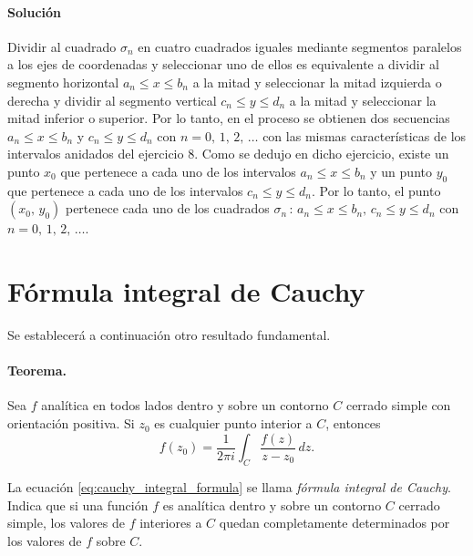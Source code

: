 \documentclass[a4paper]{report}
\begin{document}
\paragraph{Solución} Dividir al cuadrado \(\sigma_n\) en cuatro cuadrados iguales mediante segmentos paralelos a los ejes de coordenadas y seleccionar uno de ellos es equivalente a dividir al segmento horizontal \(a_n\leq x\leq b_n\) a la mitad y seleccionar la mitad izquierda o derecha y dividir al segmento vertical \(c_n\leq y\leq d_n\) a la mitad y seleccionar la mitad inferior o superior. Por lo tanto, en el proceso se obtienen dos secuencias \(a_n\leq x\leq b_n\) y \(c_n\leq y\leq d_n\) con \(n=0,\,1,\,2,\,\dots\) con las mismas características de los intervalos anidados del ejercicio 8. Como se dedujo en dicho ejercicio, existe un punto \(x_0\) que pertenece a cada uno de los intervalos \(a_n\leq x\leq b_n\) y un punto \(y_0\) que pertenece a cada uno de los intervalos \(c_n\leq y\leq d_n\). Por lo tanto, el punto \((x_0,\,y_0)\) pertenece cada uno de los cuadrados \(\sigma_n\,:\,a_n\leq x\leq b_n,\,c_n\leq y\leq d_n\) con \(n=0,\,1,\,2,\,\dots\).

\section{Fórmula integral de Cauchy}\label{sec:cauchy_integral_formula}

Se establecerá a continuación otro resultado fundamental.

\paragraph{Teorema.} Sea \(f\) analítica en todos lados dentro y sobre un contorno \(C\) cerrado simple con orientación positiva. Si \(z_0\) es cualquier punto interior a \(C\), entonces
\begin{equation}\label{eq:cauchy_integral_formula}
 f(z_0)=\frac{1}{2\pi i}\int_C\frac{f(z)}{z-z_0}\,dz. 
\end{equation}

La ecuación \ref{eq:cauchy_integral_formula} se llama \emph{fórmula integral de Cauchy}. Indica que si una función \(f\) es analítica dentro y sobre un contorno \(C\) cerrado simple, los valores de \(f\) interiores a \(C\) quedan completamente determinados por los valores de \(f\) sobre \(C\).
\end{document}
